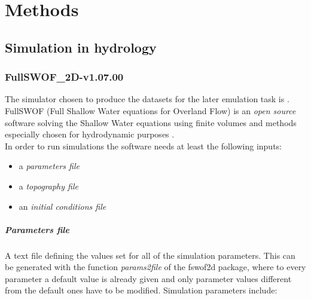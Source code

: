 \chapter{Methods}
\label{chp:methods}

\section{Simulation in hydrology}

\subsection{FullSWOF\_2D-v1.07.00}

The simulator chosen to produce the datasets for the later emulation task is . FullSWOF (Full Shallow Water equations for Overland Flow) is an \emph{open source} software solving the Shallow Water equations using finite volumes and methods especially chosen for hydrodynamic purposes \autocite{the_fullswof_team_fullswof_2018}.\\

In order to run simulations the software needs at least the following inputs:

\begin{itemize}
\itemsep0em
  \item a \emph{parameters file}
  \item a \emph{topography file}
  \item an \emph{initial conditions file}
\end{itemize}

\paragraph{Parameters file} A text file defining the values set for all of the simulation parameters. This can be generated with the function \textit{params2file} of the fswof2d package, where to every parameter a default value is already given and only parameter values different from the default ones have to be modified. Simulation parameters include:

